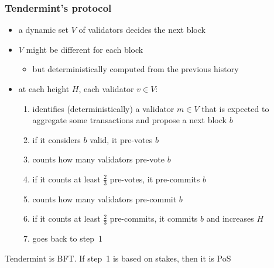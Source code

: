 \documentclass[11pt]{beamer}  %
\begin{document}
\begin{frame}\frametitle{Tendermint's protocol}

  \begin{greenbox}{}
    \begin{itemize}
    \item a dynamic set $V$ of validators decides the next block
    \item $V$ might be different for each block
      \begin{itemize}
      \item but deterministically computed from the previous history
      \end{itemize}
    \item at each height $H$, each validator $v\in V$:
      \begin{enumerate}
      \item identifies (deterministically) a validator $m\in V$ that
        is expected to aggregate some transactions and \alert{propose} a next block $b$
      \item if it considers $b$ valid, it \alert{pre-votes} $b$
      \item counts how many validators pre-vote $b$
      \item if it counts at least $\frac{2}{3}$ pre-votes, it \alert{pre-commits} $b$
      \item counts how many validators pre-commit $b$
      \item if it counts at least $\frac{2}{3}$ pre-commits, it \alert{commits} $b$ and increases $H$
      \item goes back to step~1
      \end{enumerate}
    \end{itemize}
  \end{greenbox}

  \smallskip

  \begin{center}
    Tendermint is BFT. If step~1 is based on stakes, then it is PoS
  \end{center}

\end{frame}
\end{document}
